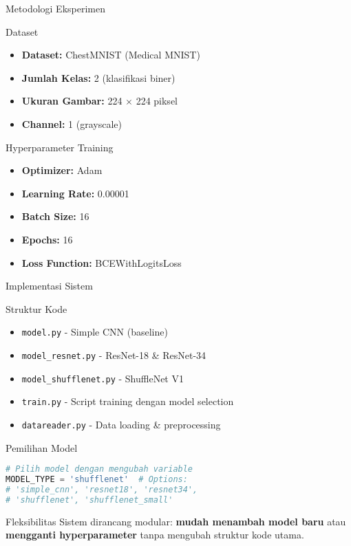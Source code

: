 \documentclass[aspectratio=169]{beamer}
\begin{document}
\begin{frame}{Metodologi Eksperimen}
\begin{block}{Dataset}
\begin{itemize}
    \item \textbf{Dataset:} ChestMNIST (Medical MNIST)
    \item \textbf{Jumlah Kelas:} 2 (klasifikasi biner)
    \item \textbf{Ukuran Gambar:} 224 $\times$ 224 piksel
    \item \textbf{Channel:} 1 (grayscale)
\end{itemize}
\end{block}

\begin{block}{Hyperparameter Training}
\begin{itemize}
    \item \textbf{Optimizer:} Adam
    \item \textbf{Learning Rate:} 0.00001
    \item \textbf{Batch Size:} 16
    \item \textbf{Epochs:} 16
    \item \textbf{Loss Function:} BCEWithLogitsLoss
\end{itemize}
\end{block}
\end{frame}

\begin{frame}[fragile]{Implementasi Sistem}
\begin{block}{Struktur Kode}
\begin{itemize}
    \item \texttt{model.py} - Simple CNN (baseline)
    \item \texttt{model\_resnet.py} - ResNet-18 \& ResNet-34
    \item \texttt{model\_shufflenet.py} - ShuffleNet V1
    \item \texttt{train.py} - Script training dengan model selection
    \item \texttt{datareader.py} - Data loading \& preprocessing
\end{itemize}
\end{block}

\begin{block}{Pemilihan Model}
\begin{lstlisting}[language=Python, basicstyle=\tiny\ttfamily, 
    backgroundcolor=\color{backcolour},
    keywordstyle=\color{blue},
    stringstyle=\color{codepurple}]
# Pilih model dengan mengubah variable
MODEL_TYPE = 'shufflenet'  # Options: 
# 'simple_cnn', 'resnet18', 'resnet34', 
# 'shufflenet', 'shufflenet_small'
\end{lstlisting}
\end{block}

\begin{alertblock}{Fleksibilitas}
Sistem dirancang modular: \textbf{mudah menambah model baru} atau \textbf{mengganti hyperparameter} tanpa mengubah struktur kode utama.
\end{alertblock}
\end{frame}
\end{document}
